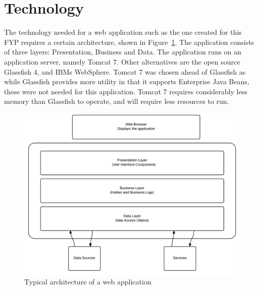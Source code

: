 \section{Technology}

The technology needed for a web application such as the one created for this FYP requires a certain architecture, shown in Figure~\ref{fig:webarch}. The application consists of three layers: Presentation, Business and Data. The application runs on an application server, namely Tomcat 7. Other alternatives are the open source Glassfish 4, and IBMs WebSphere. Tomcat 7 was chosen ahead of Glassfish as while Glassfish provides more utility in that it supports Enterprise Java Beans, these were not needed for this application. Tomcat 7 requires considerably less memory than Glassfish to operate, and will require less resources to run. 

\begin{figure}[H]
\begin{center}
\includegraphics[scale=0.20]{webapp.PNG}
\end{center}
\caption{Typical architecture of a web application}
\label{fig:webarch}
\end{figure}

